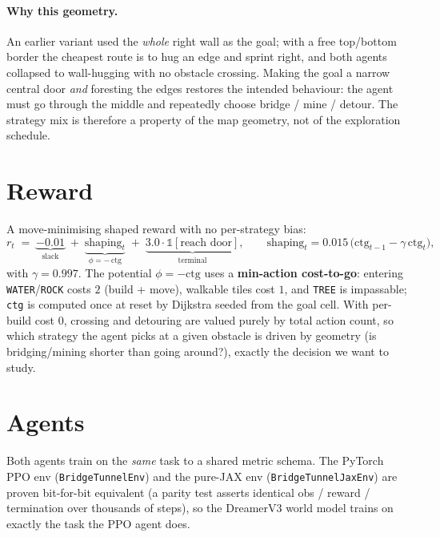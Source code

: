 \documentclass[11pt]{article}
\newcommand{\code}[1]{\texttt{#1}}
\begin{document}
\paragraph{Why this geometry.} An earlier variant used the \emph{whole} right wall
as the goal; with a free top/bottom border the cheapest route is to hug an edge and
sprint right, and both agents collapsed to wall-hugging with no obstacle crossing.
Making the goal a narrow central door \emph{and} foresting the edges restores the
intended behaviour: the agent must go through the middle and repeatedly choose
bridge / mine / detour. The strategy mix is therefore a property of the map
geometry, not of the exploration schedule.

\section{Reward}

A move-minimising shaped reward with no per-strategy bias:
\[
r_t \;=\; \underbrace{-0.01}_{\text{slack}}
\;+\;\underbrace{\text{shaping}_t}_{\phi=-\,\text{ctg}}
\;+\;\underbrace{3.0\cdot\mathbb{1}[\text{reach door}]}_{\text{terminal}},
\qquad
\text{shaping}_t = 0.015\,\big(\text{ctg}_{t-1}-\gamma\,\text{ctg}_t\big),
\]
with $\gamma=0.997$. The potential $\phi=-\text{ctg}$ uses a \textbf{min-action
cost-to-go}: entering \code{WATER}/\code{ROCK} costs $2$ (build + move), walkable
tiles cost $1$, and \code{TREE} is impassable; \code{ctg} is computed once at reset
by Dijkstra seeded from the goal cell. With per-build cost $0$, crossing and
detouring are valued purely by total action count, so which strategy the agent
picks at a given obstacle is driven by geometry (is bridging/mining shorter than
going around?), exactly the decision we want to study.

\section{Agents}

Both agents train on the \emph{same} task to a shared metric schema. The PyTorch
PPO env (\code{BridgeTunnelEnv}) and the pure-JAX env (\code{BridgeTunnelJaxEnv}) are
proven bit-for-bit equivalent (a parity test asserts identical obs / reward /
termination over thousands of steps), so the DreamerV3 world model trains on
exactly the task the PPO agent does.
\end{document}
